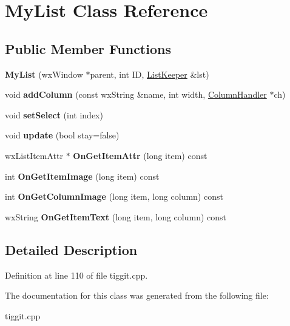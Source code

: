 \hypertarget{class_my_list}{\section{My\-List Class Reference}
\label{class_my_list}
}
\subsection*{Public Member Functions}
\begin{DoxyCompactItemize}
\item 
\hypertarget{class_my_list_a2956c0cd31cbecea84330113f59b087a}{{\bfseries My\-List} (wx\-Window $\ast$parent, int I\-D, \hyperlink{class_list_keeper}{List\-Keeper} \&lst)}\label{class_my_list_a2956c0cd31cbecea84330113f59b087a}

\item 
\hypertarget{class_my_list_a3a749f2d162bb361e2b5d0c307fe227a}{void {\bfseries add\-Column} (const wx\-String \&name, int width, \hyperlink{struct_column_handler}{Column\-Handler} $\ast$ch)}\label{class_my_list_a3a749f2d162bb361e2b5d0c307fe227a}

\item 
\hypertarget{class_my_list_a34d1c691d4c0e8a19eff844f70066fc7}{void {\bfseries set\-Select} (int index)}\label{class_my_list_a34d1c691d4c0e8a19eff844f70066fc7}

\item 
\hypertarget{class_my_list_a5b954099581dd18cff3b65520b2f2c30}{void {\bfseries update} (bool stay=false)}\label{class_my_list_a5b954099581dd18cff3b65520b2f2c30}

\item 
\hypertarget{class_my_list_a2b7b13538ace3bc0ef4e8aa4971adadf}{wx\-List\-Item\-Attr $\ast$ {\bfseries On\-Get\-Item\-Attr} (long item) const }\label{class_my_list_a2b7b13538ace3bc0ef4e8aa4971adadf}

\item 
\hypertarget{class_my_list_a550214b5f066675223d276160d8860db}{int {\bfseries On\-Get\-Item\-Image} (long item) const }\label{class_my_list_a550214b5f066675223d276160d8860db}

\item 
\hypertarget{class_my_list_aad3d159a22be0d38de6523a70162bb2a}{int {\bfseries On\-Get\-Column\-Image} (long item, long column) const }\label{class_my_list_aad3d159a22be0d38de6523a70162bb2a}

\item 
\hypertarget{class_my_list_a2bf64f809cd23949ee3bb55a4855a507}{wx\-String {\bfseries On\-Get\-Item\-Text} (long item, long column) const }\label{class_my_list_a2bf64f809cd23949ee3bb55a4855a507}

\end{DoxyCompactItemize}


\subsection{Detailed Description}


Definition at line 110 of file tiggit.\-cpp.



The documentation for this class was generated from the following file\-:\begin{DoxyCompactItemize}
\item 
tiggit.\-cpp\end{DoxyCompactItemize}
